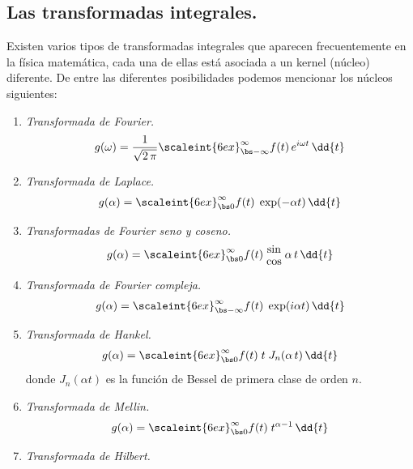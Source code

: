 \subsection{Las transformadas integrales.}

Existen varios tipos de transformadas integrales que aparecen frecuentemente en la física matemática, cada una de ellas está asociada a un kernel (núcleo) diferente. De entre las diferentes posibilidades podemos mencionar los núcleos siguientes:
\begin{enumerate}
\item \emph{Transformada de Fourier.}
\begin{align}
g (\omega) = \dfrac{1}{\sqrt{2 \, \pi}} \scaleint{6ex}_{\bs -\infty}^{\infty} f (t) \, e^{i \omega t} \, \dd{t}
\label{eq:ecuacion_07_01}
\end{align}
\item \emph{Transformada de Laplace.}
\begin{align}
g (\alpha)= \scaleint{6ex}_{\bs 0}^{\infty} f (t) \; \exp(-\alpha t) \, \dd{t}
\label{eq:ecuacion_7_02}
\end{align}
\item \emph{Transformadas de Fourier seno y coseno.}
\begin{align}
g (\alpha)= \scaleint{6ex}_{\bs 0}^{\infty} f (t) \; \substack{ \textstyle \sin \\[0.5em] \textstyle \cos} \; \alpha \, t \,  \dd{t}
\label{eq:ecuacion_7_03}
\end{align}
\item \emph{Transformada de Fourier compleja.}
\begin{align}
g (\alpha)= \scaleint{6ex}_{\bs -\infty}^{\infty} f (t) \; \exp(i \alpha t) \, \dd{t}
\label{eq:ecuacion_7_04}
\end{align}
\item \emph{Transformada de Hankel.}
\begin{align}
g (\alpha)= \scaleint{6ex}_{\bs 0}^{\infty} f (t) \; t \; J_{n} (\alpha \, t) \, \dd{t}
\label{eq:ecuacion_7_05}
\end{align}
donde $J_{n} (\alpha t)$ es la función de Bessel de primera clase de orden $n$.
\item \emph{Transformada de Mellin.}
\begin{align}
g (\alpha)= \scaleint{6ex}_{\bs 0}^{\infty} f (t) \; t^{\alpha-1} \, \dd{t}
\label{eq:ecuacion_7_06}
\end{align}
\item \emph{Transformada de Hilbert.}

\end{enumerate}

